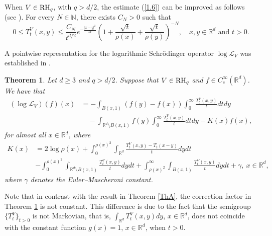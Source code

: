 \documentclass[10pt, a4paper, reqno]{amsart}
\newtheorem{ThA}{Theorem}
\theoremstyle{definition}
\theoremstyle{remark}
\newcommand{\RH}{\textup{RH}}
\numberwithin{equation}{section}
\begin{document}
When $V\in \textup{RH}_q$, with $q>d/2$, the estimate (\ref{1.6}) can be improved as follows (see \cite[Proposition 2]{DGMTZ}). For every $N\in \mathbb N$, there exists $C_N>0$ such that
\begin{equation}\label{acotTVimpr}
0\leq T_t^V(x,y)\leq \frac{C_N}{t^{d/2}}e^{-\frac{|x-y|^2}{5t}}\left(1+\frac{\sqrt{t}}{\rho (x)}+\frac{\sqrt{t}}{\rho (y)}\right)^{-N},\quad x,y\in \mathbb R^d\mbox{ and }t>0.
\end{equation}


A pointwise representation for the logarithmic Schr\"odinger operator $\log \mathcal L_V$ was established in \cite[Theorem 1.2]{BDFQ}.
\begin{ThA}\label{ThB}
Let $d\geq 3$ and $q>d/2$. Suppose that $V\in \RH_q$ and $f\in C_c^\infty (\mathbb R^d)$. We have that
\begin{align*}
    (\log \mathcal L_V)(f)(x)&=-\int_{B(x,1)}(f(y)-f(x))\int_0^\infty \frac{T_t^V(x,y)}{t}dtdy\\
    &\quad -\int_{\mathbb R^d\setminus B(x,1)}f(y)\int_0^\infty \frac{T_t^V(x,y)}{t}dtdy-K(x)f(x),
\end{align*}
for almost all $x\in \mathbb R^d$, where
\begin{align*}
  K(x)&=2\log \rho (x)+\int_0^{\rho (x)^2}\int_{\mathbb R^d}\frac{T_t^V(x,y)-T_t(x-y)}{t}dydt\\
  &-\int_0^{\rho (x)^2}\int_{\mathbb R^d\setminus B(x,1)}\frac{T_t^V(x,y)}{t}dydt+\int_{\rho (x)^2}^\infty \int_{B(x,1)}\frac{T_t^V(x,y)}{t}dydt+\gamma,\ x\in \mathbb R^d,
\end{align*}
where $\gamma$ denotes the Euler--Mascheroni constant.
\end{ThA}

Note that in contrast with the result in Theorem \ref{ThA}, the correction factor in Theorem \ref{ThB} is not constant. This difference is due to the fact that the semigroup $\{T_t^V\}_{t>0}$ is not Markovian, that is, $\int_{\mathbb R^d}T_t^V(x,y)dy$, $x\in \mathbb R^d$, does not coincide with the constant function $g(x)=1$, $x\in \mathbb R^d$, when $t>0$.
\end{document}
